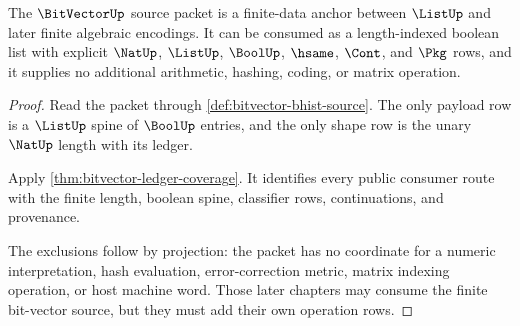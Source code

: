 \begin{theorem}\label{thm:bitvector-finite-data-anchor}
The $\BitVectorUp$ source packet is a finite-data anchor between $\ListUp$ and
later finite algebraic encodings. It can be consumed as a length-indexed
boolean list with explicit $\NatUp$, $\ListUp$, $\BoolUp$, $\hsame$, $\Cont$,
and $\Pkg$ rows, and it supplies no additional arithmetic, hashing, coding, or
matrix operation.
\end{theorem}
\begin{proof}
Read the packet through \autoref{def:bitvector-bhist-source}. The only payload
row is a $\ListUp$ spine of $\BoolUp$ entries, and the only shape row is the
unary $\NatUp$ length with its ledger.

Apply \autoref{thm:bitvector-ledger-coverage}. It identifies every public
consumer route with the finite length, boolean spine, classifier rows,
continuations, and provenance.

The exclusions follow by projection: the packet has no coordinate for a
numeric interpretation, hash evaluation, error-correction metric, matrix
indexing operation, or host machine word. Those later chapters may consume the
finite bit-vector source, but they must add their own operation rows.
\end{proof}

